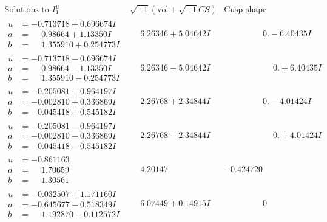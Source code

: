 \documentclass[1p]{elsarticle_modified}
\theoremstyle{definition}
\newcommand{\I}{\sqrt{-1}}
\begin{document}
$$\begin{array}{c|c|c}  
\text{Solutions to }I^u_{1}& \I (\text{vol} + \sqrt{-1}CS) & \text{Cusp shape}\\
 \hline 
\begin{aligned}
u &= -0.713718 + 0.696674 I \\
a &= \phantom{-}0.98664 + 1.13350 I \\
b &= \phantom{-}1.355910 + 0.254773 I\end{aligned}
 & \phantom{-}6.26346 + 5.04642 I & \phantom{-0.000000 } 0. - 6.40435 I \\ \hline\begin{aligned}
u &= -0.713718 - 0.696674 I \\
a &= \phantom{-}0.98664 - 1.13350 I \\
b &= \phantom{-}1.355910 - 0.254773 I\end{aligned}
 & \phantom{-}6.26346 - 5.04642 I & \phantom{-0.000000 -}0. + 6.40435 I \\ \hline\begin{aligned}
u &= -0.205081 + 0.964197 I \\
a &= -0.002810 + 0.336869 I \\
b &= -0.045418 + 0.545182 I\end{aligned}
 & \phantom{-}2.26768 + 2.34844 I & \phantom{-0.000000 } 0. - 4.01424 I \\ \hline\begin{aligned}
u &= -0.205081 - 0.964197 I \\
a &= -0.002810 - 0.336869 I \\
b &= -0.045418 - 0.545182 I\end{aligned}
 & \phantom{-}2.26768 - 2.34844 I & \phantom{-0.000000 -}0. + 4.01424 I \\ \hline\begin{aligned}
u &= -0.861163\phantom{ +0.000000I} \\
a &= \phantom{-}1.70659\phantom{ +0.000000I} \\
b &= \phantom{-}1.30561\phantom{ +0.000000I}\end{aligned}
 & \phantom{-}4.20147\phantom{ +0.000000I} & -0.424720\phantom{ +0.000000I} \\ \hline\begin{aligned}
u &= -0.032507 + 1.171160 I \\
a &= -0.645677 - 0.518349 I \\
b &= \phantom{-}1.192870 - 0.112572 I\end{aligned}
 & \phantom{-}6.07449 + 0.14915 I & \phantom{-0.000000 } 0 \\ \hline\begin{aligned}

\end{aligned}
\end{array}$$
\end{document}
